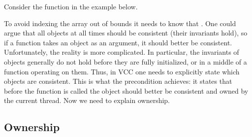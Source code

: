 Consider the function  in the example below. 


\noindent
To avoid indexing the  array out of bounds it needs to know
that . 
One could argue that all objects at all times should be consistent (\ie their
invariants hold),
so if a function takes an object as an argument, it should better be consistent.
Unfortunately, the reality is more complicated.
In particular, the invariants of objects generally do not hold before they are fully
initialized, or in a middle of a function operating on them.
Thus, in VCC one needs to explicitly state which objects are consistent.
This is what the  precondition achieves:
it states that before the function is called the object should
better be consistent and owned by the current thread.
Now we need to explain ownership.

\subsection{Ownership}


